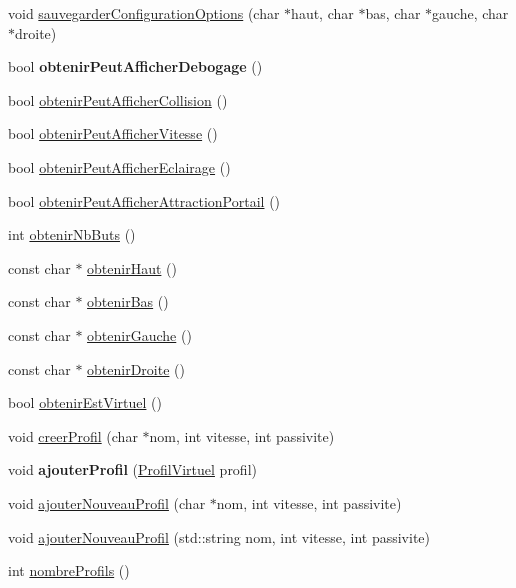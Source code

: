\begin{DoxyCompactItemize}
\item 
void \hyperlink{group__inf2990_ga2abaa6d8b60740932e156fcdac94fe33}{sauvegarder\+Configuration\+Options} (char $\ast$haut, char $\ast$bas, char $\ast$gauche, char $\ast$droite)
\item 
bool {\bfseries obtenir\+Peut\+Afficher\+Debogage} ()
\item 
bool \hyperlink{group__inf2990_gaf53d5c1a7b11c7a187080ce3e58811f4}{obtenir\+Peut\+Afficher\+Collision} ()
\item 
bool \hyperlink{group__inf2990_ga89d12aa893262cc19dda94de7685e05e}{obtenir\+Peut\+Afficher\+Vitesse} ()
\item 
bool \hyperlink{group__inf2990_ga471c6fd7ba07062b8a831f6cef8eec8b}{obtenir\+Peut\+Afficher\+Eclairage} ()
\item 
bool \hyperlink{group__inf2990_gae7fee4c771d7e99f5973a52c2c53f929}{obtenir\+Peut\+Afficher\+Attraction\+Portail} ()
\item 
int \hyperlink{group__inf2990_ga2711a3dfeea35df137399bf9b70a8e8f}{obtenir\+Nb\+Buts} ()
\item 
const char $\ast$ \hyperlink{group__inf2990_gab24e8855fff89b6b216380d4411c162b}{obtenir\+Haut} ()
\item 
const char $\ast$ \hyperlink{group__inf2990_gaa0586d36dcf7754f4faf63a98bc9616d}{obtenir\+Bas} ()
\item 
const char $\ast$ \hyperlink{group__inf2990_ga2e822ac6b12a0cd2583ee2f7dbeb7a60}{obtenir\+Gauche} ()
\item 
const char $\ast$ \hyperlink{group__inf2990_gad6525ab642196854615ecdb3313ddd8b}{obtenir\+Droite} ()
\item 
bool \hyperlink{group__inf2990_gafa3ae8eed6176af302d3b1f20143a49c}{obtenir\+Est\+Virtuel} ()
\item 
void \hyperlink{group__inf2990_ga23b1fe16682e55d35d633bf939110343}{creer\+Profil} (char $\ast$nom, int vitesse, int passivite)
\item 
void {\bfseries ajouter\+Profil} (\hyperlink{class_profil_virtuel}{Profil\+Virtuel} profil)
\item 
void \hyperlink{group__inf2990_gaf4579c0cd1f6a30d196cbcee74dab4d1}{ajouter\+Nouveau\+Profil} (char $\ast$nom, int vitesse, int passivite)
\item 
void \hyperlink{group__inf2990_ga13743b58c50d8b9d5d0b924999003667}{ajouter\+Nouveau\+Profil} (std\+::string nom, int vitesse, int passivite)
\item 
int \hyperlink{group__inf2990_ga416b992be6a5d386f20356137a7dfc04}{nombre\+Profils} ()

\end{DoxyCompactItemize}
